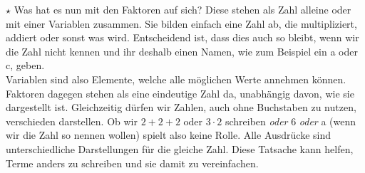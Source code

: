 \(\star\) Was hat es nun mit den Faktoren auf sich? Diese stehen als Zahl alleine oder mit einer Variablen zusammen. Sie bilden einfach eine Zahl ab, die multipliziert, addiert oder sonst was wird. Entscheidend ist, dass dies auch so bleibt, wenn wir die Zahl nicht kennen und ihr deshalb einen Namen, wie zum Beispiel ein a oder c, geben.\\
Variablen sind also Elemente, welche alle möglichen Werte annehmen können. Faktoren dagegen stehen als eine eindeutige Zahl da, unabhängig davon, wie sie dargestellt ist.
Gleichzeitig dürfen wir Zahlen, auch ohne Buchstaben zu nutzen, verschieden darstellen. Ob wir \(2+2+2\text{ oder }3\cdot 2\) schreiben \textit{oder} 6 \textit{oder} a (wenn wir die Zahl so nennen wollen) spielt also keine Rolle. Alle Ausdrücke sind unterschiedliche Darstellungen für die gleiche Zahl. Diese Tatsache kann helfen, Terme anders zu schreiben und sie damit zu vereinfachen.\\
